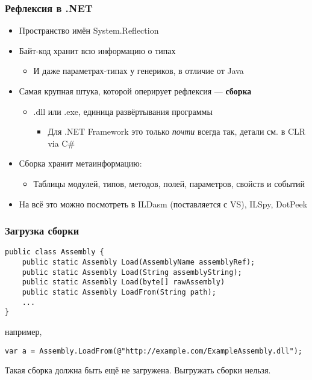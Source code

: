 \documentclass{../../slides-style}
\begin{document}
    \begin{frame}
        \frametitle{Рефлексия в .NET}
        \begin{itemize}
            \item Пространство имён System.Reflection
            \item Байт-код хранит всю информацию о типах 
            \begin{itemize}
                \item И даже параметрах-типах у генериков, в отличие от Java
            \end{itemize}
            \item Самая крупная штука, которой оперирует рефлексия --- \textbf{сборка}
            \begin{itemize}
                \item .dll или .exe, единица развёртывания программы
                \begin{itemize}
                    \item Для .NET Framework это только \emph{почти} всегда так, детали см. в CLR via C\#
                \end{itemize}
            \end{itemize}
            \item Сборка хранит метаинформацию:
            \begin{itemize}
                \item Таблицы модулей, типов, методов, полей, параметров, свойств и событий
            \end{itemize}
            \item На всё это можно посмотреть в ILDasm (поставляется с VS), ILSpy, DotPeek
        \end{itemize}
    \end{frame}

    \begin{frame}[fragile]
        \frametitle{Загрузка сборки}
        \begin{small}
            \begin{verbatim}
public class Assembly {
    public static Assembly Load(AssemblyName assemblyRef);
    public static Assembly Load(String assemblyString);
    public static Assembly Load(byte[] rawAssembly)
    public static Assembly LoadFrom(String path);
    ...
}
            \end{verbatim}
            например,
            \begin{verbatim}
var a = Assembly.LoadFrom(@"http://example.com/ExampleAssembly.dll");
            \end{verbatim}
            Такая сборка должна быть ещё не загружена. Выгружать сборки нельзя.
        \end{small}
    \end{frame}
\end{document}
